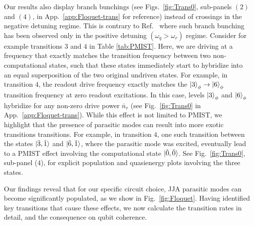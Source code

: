 \documentclass[%
reprint,
superscriptaddress,
 amsmath,amssymb,
 aps,
 prx,
longbibliography,
floatfix,
]{revtex4-2}
\begin{document}
Our results also display branch bunchings (see Figs.~\ref{fig:Trans0}, sub-panels $(2)$ and $(4)$, in App.~\ref{app:Floquet-trans} for reference) instead of crossings in the negative detuning regime. This is contrary to Ref.~\cite{dumas2024unified} where such branch bunching has been observed only in the positive detuning $(\omega_q>\omega_r)$ regime.  Consider for example transitions $3$ and $4$ in Table \ref{tab:PMIST}. Here, we are  driving at a frequency that exactly matches the transition frequency between two non-computational states, such that these states immediately start to hybridize into an equal superposition of the two 
original undriven states.  For example, in transition $4$, the readout drive frequency exactly matches the $\ket{3}_\phi \rightarrow \ket{6}_\phi$ transition frequency at zero readout excitations. In this case, levels $\ket{3}_\phi$ and $\ket{6}_\phi$ hybridize for any non-zero drive power $\bar n_r$  (see Fig.~\ref{fig:Trans0} in App.~\ref{app:Floquet-trans}). While this effect is not limited to PMIST, we highlight that the presence of parasitic modes can result into more exotic transitions transitions. For example, in transition  $4$, one such transition between the states $\ket{\tilde{3},\tilde{1}}$ and $\ket{\tilde{6},\tilde{1}}$, where the parasitic mode was excited, eventually lead to a PMIST effect involving the computational state $\ket{\tilde{0},\tilde{0}}$. See Fig.~\ref{fig:Trans0}, sub-panel ($4$), for explicit population and quasienergy plots involving the three states.



Our findings reveal that for our specific circuit choice, JJA parasitic modes can become significantly populated, as we show in Fig.~\ref{fig:Floquet}. Having identified key transitions that cause these effects, we now calculate the transition rates in detail, and the consequence on qubit coherence. 
\end{document}
